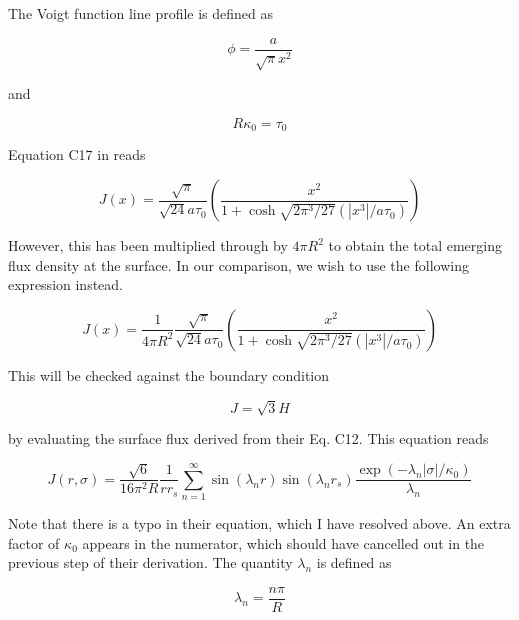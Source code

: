\documentclass[onecolumn]{aastex63}
\begin{document}
The Voigt function line profile is defined as 

\begin{equation} \label{lineprofile}
    \phi = \frac{a}{\sqrt{\pi} x^2}
\end{equation}

and

\begin{equation} \label{tau}
    R\kappa_0 = \tau_0
\end{equation}

Equation C17 in \citet{2006ApJ...649...14D} reads

\begin{equation} \label{dijkstra}
    J(x) = \frac{\sqrt{\pi}}{\sqrt{24}a\tau_0}\left(\frac{x^2}{1 + \cosh{\sqrt{2\pi^3/27}(|x^3|/a\tau_0)}}\right)
\end{equation}

However, this has been multiplied through by $4\pi R^2$ to obtain the total emerging flux density at the surface. In our comparison, we wish to use the following expression instead.

\begin{equation} \label{c17/4piR^2}
    J(x) = \frac{1}{4\pi R^2}\frac{\sqrt{\pi}}{\sqrt{24}a\tau_0}\left(\frac{x^2}{1 + \cosh{\sqrt{2\pi^3/27}(|x^3|/a\tau_0)}}\right)
\end{equation}

This will be checked against the boundary condition

\begin{equation} \label{bc}
    J = \sqrt{3} H
\end{equation}

by evaluating the surface flux derived from their Eq. C12. This equation reads 

\begin{equation} \label{c12}
    J(r, \sigma) = \frac{\sqrt{6}}{16 \pi^2 R} \frac{1}{rr_s} \sum_{n=1}^{\infty}\sin(\lambda_n r) \sin(\lambda_n r_s) \frac{\exp{(-\lambda_n |\sigma|/\kappa_0)}}{\lambda_n}
\end{equation}

Note that there is a typo in their equation, which I have resolved above. An extra factor of $\kappa_0$ appears in the numerator, which should have cancelled out in the previous step of their derivation. The quantity $\lambda_n$ is defined as 

\begin{equation} \label{lambdan}
    \lambda_n = \frac{n\pi}{R}
\end{equation}
\end{document}
